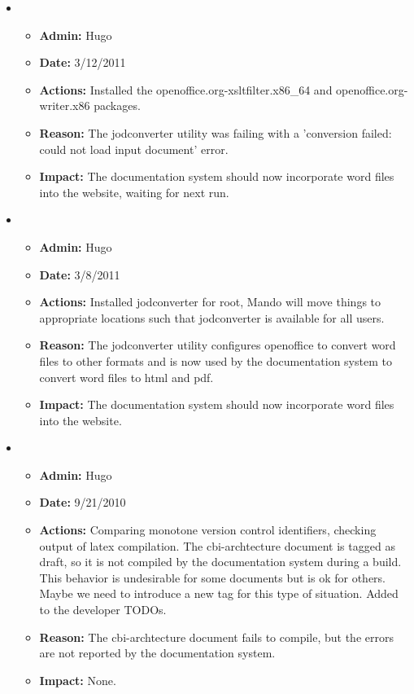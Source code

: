 \documentclass[12pt]{article}
\begin{document}
\begin{itemize}

\item 
\begin{itemize}
\item[] {\bf Admin:} Hugo
\item[] {\bf Date:} 3/12/2011 
\item[] {\bf Actions:} Installed the openoffice.org-xsltfilter.x86\_64
  and openoffice.org-writer.x86 packages.
\item[] {\bf Reason:} The jodconverter utility was failing with a
  'conversion failed: could not load input document' error.
\item[] {\bf Impact:} The documentation system should now incorporate
  word files into the website, waiting for next run.
\end{itemize}

\item 
\begin{itemize}
\item[] {\bf Admin:} Hugo
\item[] {\bf Date:} 3/8/2011 
\item[] {\bf Actions:} Installed jodconverter for root, Mando will move things to appropriate locations such that jodconverter is available for all users.
\item[] {\bf Reason:} The jodconverter utility configures openoffice to convert word files to other formats and is now used by the documentation system to convert word files to html and pdf.
\item[] {\bf Impact:} The documentation system should now incorporate word files into the website.
\end{itemize}

\item 
\begin{itemize}
\item[] {\bf Admin:} Hugo
\item[] {\bf Date:} 9/21/2010 
\item[] {\bf Actions:} Comparing monotone version control identifiers, checking output of latex compilation.  The cbi-archtecture document is tagged as draft, so it is not compiled by the documentation system during a build.  This behavior is undesirable for some documents but is ok for others.  Maybe we need to introduce a new tag for this type of situation.  Added to the developer TODOs.
\item[] {\bf Reason:} The cbi-archtecture document fails to compile, but the errors are not reported by the documentation system.
\item[] {\bf Impact:} None.
\end{itemize}


\end{itemize}
\end{document}
